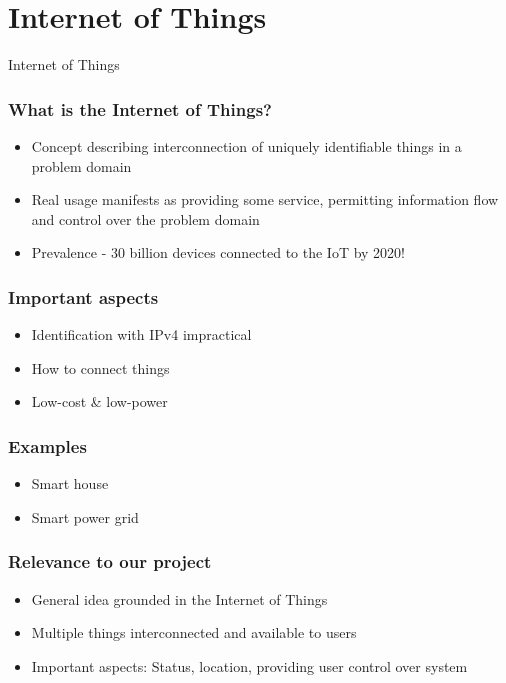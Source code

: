 \section{Internet of Things}

\begin{frame}
\begin{center}
\Huge Internet of Things
\end{center}
\end{frame}

\begin{frame}
\frametitle{What is the Internet of Things?}
\begin{itemize}
\item Concept describing interconnection of uniquely identifiable things in a problem domain
\item Real usage manifests as providing some service, permitting information flow and control over the problem domain
\item Prevalence - 30 billion devices connected to the IoT by 2020!
\end{itemize}
\end{frame}

\begin{frame}
\frametitle{Important aspects}
\begin{itemize}
\item Identification with IPv4 impractical
\item How to connect things
\item Low-cost \& low-power
\end{itemize}
\end{frame}

\begin{frame}
\frametitle{Examples}
\begin{itemize}
\item Smart house
\item Smart power grid
\end{itemize}
\end{frame}

\begin{frame}
\frametitle{Relevance to our project}
\begin{itemize}
\item General idea grounded in the Internet of Things
\item Multiple things interconnected and available to users
\item Important aspects: Status, location, providing user control over system
\end{itemize}
\end{frame}

